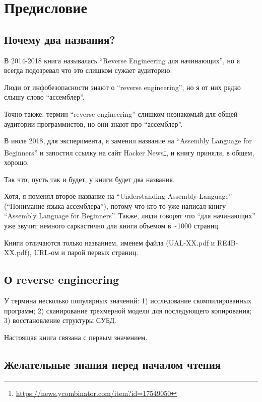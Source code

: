 \section*{Предисловие}

\subsection*{Почему два названия?}
\label{TwoTitles}

В 2014-2018 книга называлась ``Reverse Engineering для начинающих'', но я всегда подозревал что это слишком сужает аудиторию.

Люди от инфобезопасности знают о ``reverse engineering'', но я от них редко слышу слово ``ассемблер''.

Точно также, термин ``reverse engineering'' слишком незнакомый для общей аудитории программистов, но они знают про ``ассемблер''.

В июле 2018, для эксперимента, я заменил название на ``Assembly Language for Beginners''
и запостил ссылку на сайт Hacker News\footnote{\url{https://news.ycombinator.com/item?id=17549050}}, и книгу приняли, в общем, хорошо.

Так что, пусть так и будет, у книги будет два названия.

Хотя, я поменял второе название на ``Understanding Assembly Language'' (``Понимание языка ассемблера''), потому что кто-то уже написал книгу ``Assembly Language for Beginners''.
Также, люди говорят что ``для начинающих'' уже звучит немного саркастично для книги объемом в \textasciitilde{}1000 страниц.

Книги отличаются только названием, именем файла (UAL-XX.pdf и RE4B-XX.pdf), URL-ом и парой первых страниц.

\subsection*{О reverse engineering}

У термина  несколько популярных значений:
1) исследование скомпилированных
программ;
2) сканирование трехмерной модели для последующего копирования;
3) восстановление структуры СУБД.

Настоящая книга связана с первым значением.

\subsection*{Желательные знания перед началом чтения}

